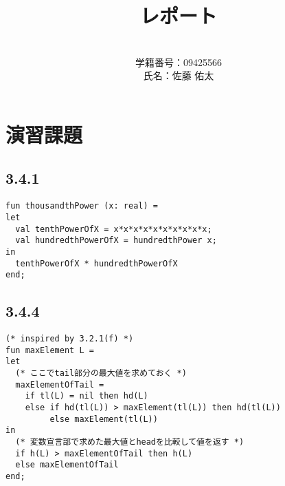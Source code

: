 \documentclass[a4j]{jarticle}
\title{レポート}
\author{\\学籍番号：09425566\\氏名：佐藤 佑太}
\begin{document}
\maketitle

\newpage


\section{演習課題}


\subsection{3.4.1}

\begin{verbatim}
fun thousandthPower (x: real) =
let
  val tenthPowerOfX = x*x*x*x*x*x*x*x*x*x;
  val hundredthPowerOfX = hundredthPower x;
in
  tenthPowerOfX * hundredthPowerOfX
end;
\end{verbatim}

\subsection{3.4.4}

\begin{verbatim}
(* inspired by 3.2.1(f) *)
fun maxElement L =
let
  (* ここでtail部分の最大値を求めておく *)
  maxElementOfTail = 
    if tl(L) = nil then hd(L)
    else if hd(tl(L)) > maxElement(tl(L)) then hd(tl(L))
         else maxElement(tl(L))
in
  (* 変数宣言部で求めた最大値とheadを比較して値を返す *)
  if h(L) > maxElementOfTail then h(L)
  else maxElementOfTail
end;
\end{verbatim}
\end{document}
